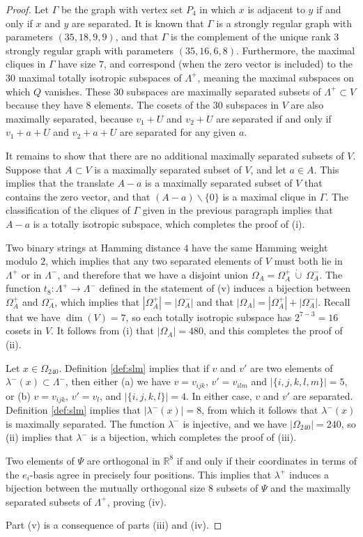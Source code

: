 \documentclass{amsart}
\theoremstyle{plain}
\theoremstyle{definition}
\theoremstyle{remark}
\numberwithin{equation}{section}
\newcommand{\R}{{\mathbb R}}
\newcommand{\ra}{\rightarrow}
\newcommand{\qpx}{\Omega_{240}}
\newcommand{\qp}{\Omega}
\newcommand{\lamp}{\Lambda^+}
\newcommand{\slm}{\lambda^-}
\newcommand{\slp}{\lambda^+}
\newcommand{\lamm}{\Lambda^-}
\begin{document}
\begin{proof}
Let $\Gamma$ be the graph with vertex set $P_4$ in which $x$ is adjacent to $y$ if and only if $x$ and $y$ are
separated. It is known \cite[\S10.13]{brouwer22} that $\Gamma$ is a strongly regular graph with parameters 
$(35, 18, 9, 9)$, and that $\Gamma$ is the complement of the unique rank $3$ strongly regular graph with parameters 
$(35, 16, 6, 8)$. Furthermore, the maximal cliques in $\Gamma$ have size $7$, and correspond (when the zero vector is 
included) to the $30$ maximal totally isotropic subspaces of $\lamp$, meaning the maximal subspaces on which $Q$
vanishes. These $30$ subspaces are maximally separated subsets of $\lamp \subset V$ because they have $8$ elements. The 
cosets of the $30$ subspaces in $V$ are also maximally separated, because $v_1 + U$ and $v_2 + U$ are separated if
and only if $v_1 + a + U$ and $v_2 + a + U$ are separated for any given $a$.

It remains to show that there are no additional maximally separated subsets of $V$.
Suppose that $A \subset V$ is a maximally separated subset of $V$, and let $a \in A$. This implies that the translate
$A - a$ is a maximally separated subset of $V$ that contains the zero vector, and that $(A - a) \backslash \{0\}$ is
a maximal clique in $\Gamma$. The classification of the cliques of $\Gamma$ given in the previous paragraph implies
that $A - a$ is a totally isotropic subspace, which completes the proof of (i).

Two binary strings at Hamming distance $4$ have the same Hamming weight modulo $2$, which implies that any two
separated elements of $V$ must both lie in $\lamp$ or in $\lamm$, and therefore that we have a disjoint union 
$\qp_A = \qp^+_A \ \dot\cup \ \qp^-_A$. The function $t_8 : \lamp \ra \lamm$ defined in the statement of (v)
induces a bijection between $\qp^+_A$ and $\qp^-_A$, which implies that $|\qp^+_A| = |\qp^-_A|$ and that
$|\qp_A| = |\qp^+_A| + |\qp^-_A|$. Recall that we have $\dim(V)=7$, so each totally isotropic subspace has 
$2^{7-3}=16$ cosets in $V$. It follows from (i) that $|\qp_A|=480$, and this completes the proof of (ii). 

Let $x \in \qpx$. Definition \ref{def:slm} implies that if $v$ and $v'$ are two elements of 
$\slm(x) \subset \lamm$, then either (a) we have $v = v_{ijk}$, $v' = v_{ilm}$ and $|\{i, j, k, l, m\}| = 5$, 
or (b) $v = v_{ijk}$, $v' = v_l$, and $|\{i, j, k, l\}| = 4$. In either case, $v$ and $v'$ are separated.
Definition \ref{def:slm} implies that $|\slm(x)| = 8$, from which it follows that $\slm(x)$ is maximally
separated. The function $\slm$ is injective, and we have $|\qpx| = 240$, so (ii) implies that $\slm$ is a
bijection, which completes the proof of (iii).

Two elements of $\Psi$ are orthogonal in $\R^8$ if and only if their coordinates in terms of the $e_i$-basis
agree in precisely four positions. This implies that $\slp$ induces a bijection between the mutually orthogonal 
size $8$ subsets of $\Psi$ and the maximally separated subsets of $\lamp$, proving (iv).

Part (v) is a consequence of parts (iii) and (iv).   
\end{proof}
\end{document}
